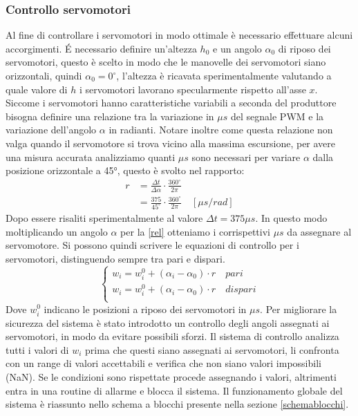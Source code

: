 \documentclass[11pt]{article}
\begin{document}
\subsubsection{Controllo servomotori}
Al fine di controllare i servomotori in modo ottimale è necessario effettuare alcuni accorgimenti.
É necessario definire un'altezza $h_0$ e un angolo $\alpha_0$ di riposo dei servomotori, questo è scelto in modo che le manovelle dei servomotori siano orizzontali, quindi $\alpha_0=0^\circ$, l'altezza è ricavata sperimentalmente valutando a quale valore di $h$ i servomotori lavorano specularmente rispetto all'asse $x$.
Siccome i servomotori hanno caratteristiche variabili a seconda del produttore bisogna definire una relazione tra la variazione in $\mu s$ del segnale PWM e la variazione dell'angolo $\alpha$ in radianti. Notare inoltre come questa relazione non valga quando il servomotore si trova vicino alla massima escursione, per avere una misura accurata analizziamo quanti $\mu s$ sono necessari per variare $\alpha$ dalla posizione orizzontale a 45°, questo è svolto nel rapporto:
\begin{align}\label{rel}
r &=\frac{\Delta t}{\Delta\alpha}\cdot \frac{360^\circ}{2 \pi}\\
	&= \frac{375}{45^\circ}\cdot \frac{360^\circ}{2 \pi} \quad [\mu s/rad]
\end{align}
Dopo essere risaliti sperimentalmente al valore $\Delta t = 375 \mu s$. In questo modo moltiplicando un angolo $\alpha$ per la \eqref{rel} otteniamo i corrispettivi $\mu s$ da assegnare al servomotore. Si possono quindi scrivere le equazioni di controllo per i servomotori, distinguendo sempre tra pari e dispari.
\begin{equation}\label{w}
    \begin{cases}
      w_i=w_i^0 +(\alpha_i-\alpha_0)\cdot r	\quad pari \\
      w_i=w_i^0 +(\alpha_i-\alpha_0)\cdot r	\quad dispari \\
    \end{cases}
\end{equation}
Dove $w_i^0$ indicano le posizioni a riposo dei servomotori in $\mu s$.
Per migliorare la sicurezza del sistema è stato introdotto un controllo degli angoli assegnati ai servomotori, in modo da evitare possibili sforzi.
Il sistema di controllo analizza tutti i valori di $w_i$ prima che questi siano assegnati ai servomotori, li confronta con un range di valori accettabili e verifica che non siano valori impossibili (NaN).
Se le condizioni sono rispettate procede assegnando i valori, altrimenti entra in una routine di allarme e blocca il sistema. Il funzionamento globale del sistema è riassunto nello schema a blocchi presente nella sezione \ref{schemablocchi}.
\end{document}
